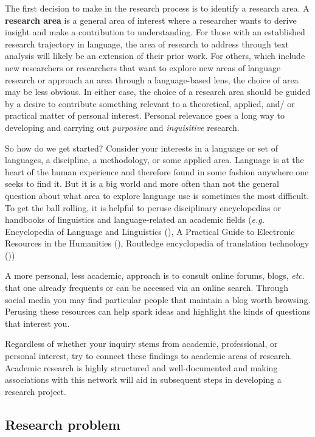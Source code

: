 \documentclass[
  letterpaper,
  krantz1]{latex/krantz-mod}
\theoremstyle{definition}
\theoremstyle{definition}
\theoremstyle{remark}
\begin{document}
The first decision to make in the research process is to identify a
research area. A \textbf{research area} is a general area of interest
where a researcher wants to derive insight and make a contribution to
understanding. For those with an established research trajectory in
language, the area of research to address through text analysis will
likely be an extension of their prior work. For others, which include
new researchers or researchers that want to explore new areas of
language research or approach an area through a language-based lens, the
choice of area may be less obvious. In either case, the choice of a
research area should be guided by a desire to contribute something
relevant to a theoretical, applied, and/ or practical matter of personal
interest. Personal relevance goes a long way to developing and carrying
out \emph{purposive} and \emph{inquisitive} research.

So how do we get started? Consider your interests in a language or set
of languages, a discipline, a methodology, or some applied area.
Language is at the heart of the human experience and therefore found in
some fashion anywhere one seeks to find it. But it is a big world and
more often than not the general question about what area to explore
language use is sometimes the most difficult. To get the ball rolling,
it is helpful to peruse disciplinary encyclopedias or handbooks of
linguistics and language-related an academic fields (\emph{e.g.}
Encyclopedia of Language and Linguistics
(), A Practical Guide to Electronic
Resources in the Humanities (), Routledge encyclopedia of translation technology
())

A more personal, less academic, approach is to consult online forums,
blogs, \emph{etc}. that one already frequents or can be accessed via an
online search. Through social media you may find particular people that
maintain a blog worth browsing. Perusing these resources can help spark
ideas and highlight the kinds of questions that interest you.

Regardless of whether your inquiry stems from academic, professional, or
personal interest, try to connect these findings to academic areas of
research. Academic research is highly structured and well-documented and
making associations with this network will aid in subsequent steps in
developing a research project.

\subsection{Research problem}\label{sec-research-problem}
\end{document}
